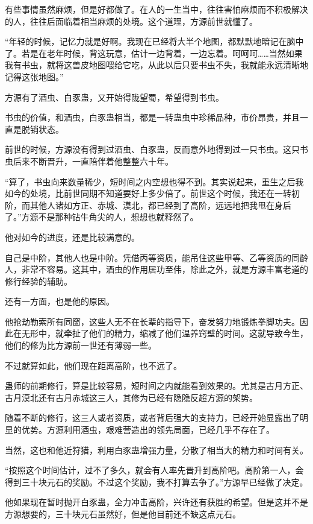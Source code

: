 \begin{this_body}
有些事情虽然麻烦，但是好都做了。在人的一生当中，往往害怕麻烦而不积极解决的人，往往后面临着相当麻烦的处境。这个道理，方源前世就懂了。

“年轻的时候，记忆力就是好啊。我现在已经将大半个地图，都默默地暗记在脑中了。若是在老年时候，背这玩意，估计一边背着，一边忘着。呵呵呵……当然如果我有书虫，就将这兽皮地图喂给它吃，从此以后只要书虫不失，我就能永远清晰地记得这张地图。”

方源有了酒虫、白豕蛊，又开始得陇望蜀，希望得到书虫。

书虫的价值，和酒虫，白豕蛊相当，都是一转蛊虫中珍稀品种，市价昂贵，并且一直是脱销状态。

前世的时候，方源没有得到过酒虫、白豕蛊，反而意外地得到过一只书虫。这只书虫后来不断晋升，一直陪伴着他整整六十年。

“算了，书虫向来数量稀少，短时间之内空想也得不到。其实说起来，重生之后我如今的处境，比前世同期不知道要好上多少倍了。前世这个时候，我还在一转初阶，而其他人诸如方正、赤城、漠北，都已经到了高阶，远远地把我甩在身后了。”方源不是那种钻牛角尖的人，想想也就释然了。

他对如今的进度，还是比较满意的。

自己是中阶，其他人也是中阶。凭借丙等资质，能吊住这些甲等、乙等资质的同龄人，非常不容易。这其中，酒虫的作用居功至伟，除此之外，就是方源丰富老道的修行经验的辅助。

还有一方面，也是他的原因。

他抢劫勒索所有同窗，这些人无不在长辈的指导下，奋发努力地锻炼拳脚功夫。因此在无形中，就牵扯了他们的精力，缩减了他们温养窍壁的时间。这就导致今生，他们的修为比方源前一世还有薄弱一些。

不过就算如此，他们现在距离高阶，也不远了。

蛊师的前期修行，算是比较容易，短时间之内就能看到效果的。尤其是古月方正、古月漠北还有古月赤城这三人，其修为已经有隐隐反超方源的架势。

随着不断的修行，这三人或者资质，或者背后强大的支持力，已经开始显露出了明显的优势。方源利用酒虫，艰难营造出的领先局面，已经几乎不存在了。

当然，这也和他近狩猎，利用白豕蛊增强力量，分散了相当大的精力和时间有关。

“按照这个时间估计，过不了多久，就会有人率先晋升到高阶吧。高阶第一人，会得到三十块元石的奖励。不过这个奖励，我不打算去争了。”方源早已经做了决定。

他如果现在暂时抛开白豕蛊，全力冲击高阶，兴许还有获胜的希望。但是这并不是方源想要的，三十块元石虽然好，但是他目前还不缺这点元石。


\end{this_body}
